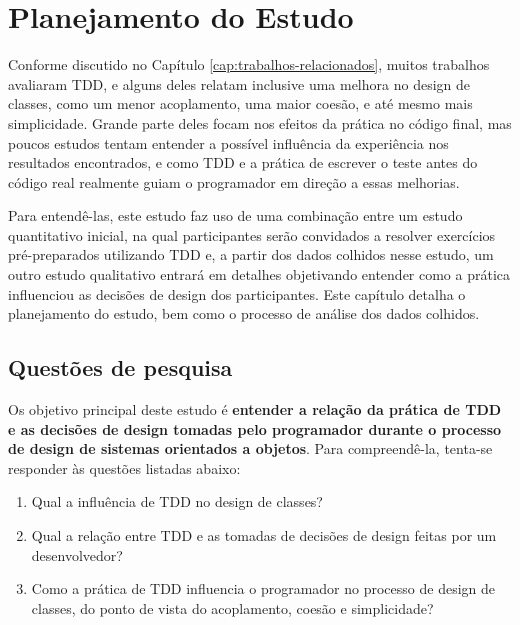 \chapter{Planejamento do Estudo}
\label{cap:planejamento}

Conforme discutido no Capítulo \ref{cap:trabalhos-relacionados}, muitos 
trabalhos avaliaram TDD, e alguns deles relatam inclusive uma melhora
no design de classes, como um menor acoplamento, uma maior coesão, e até mesmo
mais simplicidade. 
Grande parte deles focam nos efeitos da prática
no código final, mas poucos estudos tentam entender a possível influência da experiência
nos resultados encontrados, e como TDD e a
prática de escrever o teste antes do código real realmente guiam o programador 
em direção a essas melhorias.

Para entendê-las, este estudo faz uso de uma combinação entre um estudo quantitativo inicial, na qual participantes serão
convidados a resolver exercícios pré-preparados utilizando TDD e, a partir dos dados colhidos nesse estudo, um outro
estudo qualitativo entrará em detalhes objetivando entender como a prática influenciou as decisões de design dos participantes.
Este capítulo detalha o planejamento do estudo, 
bem como o processo de análise dos dados colhidos.

\section{Questões de pesquisa}

Os objetivo principal deste estudo é \textbf{entender a relação da prática de TDD 
e as decisões de design tomadas pelo programador durante o processo de 
design de sistemas orientados a objetos}.
Para compreendê-la, tenta-se responder às questões listadas
abaixo:

\begin{enumerate}

	\item Qual a influência de TDD no design de classes?

	\item Qual a relação entre TDD e as tomadas de decisões de design
	feitas por um desenvolvedor?

	\item Como a prática de TDD influencia o programador no processo de  
	design de classes, do ponto de vista do acoplamento, coesão e simplicidade?

\end{enumerate}

